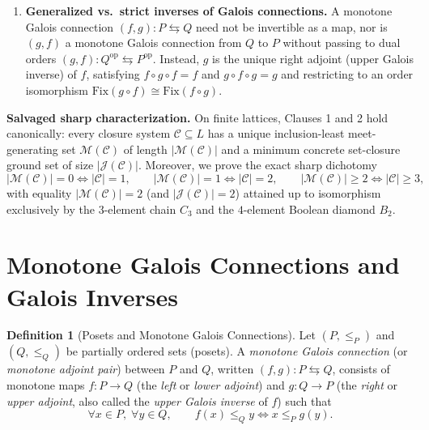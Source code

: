 \documentclass[11pt,a4paper]{article}
\theoremstyle{definition}
\newtheorem{definition}[theorem]{Definition}
\theoremstyle{remark}
\begin{document}
\begin{enumerate}
\item \textbf{Generalized vs.\ strict inverses of Galois connections.} A monotone Galois connection $(f, g) : P \leftrightarrows Q$ need not be invertible as a map, nor is $(g, f)$ a monotone Galois connection from $Q$ to $P$ without passing to dual orders $(g, f) : Q^{\mathrm{op}} \leftrightarrows P^{\mathrm{op}}$. Instead, $g$ is the unique right adjoint (upper Galois inverse) of $f$, satisfying $f \circ g \circ f = f$ and $g \circ f \circ g = g$ and restricting to an order isomorphism $\mathrm{Fix}(g \circ f) \cong \mathrm{Fix}(f \circ g)$.
\end{enumerate}

\noindent\textbf{Salvaged sharp characterization.} On finite lattices, Clauses 1 and 2 hold canonically: every closure system $\mathcal{C} \subseteq L$ has a unique inclusion-least meet-generating set $\mathcal{M}(\mathcal{C})$ of length $|\mathcal{M}(\mathcal{C})|$ and a minimum concrete set-closure ground set of size $|\mathcal{J}(\mathcal{C})|$. Moreover, we prove the exact sharp dichotomy
\[
|\mathcal{M}(\mathcal{C})| = 0 \iff |\mathcal{C}| = 1, \qquad
|\mathcal{M}(\mathcal{C})| = 1 \iff |\mathcal{C}| = 2, \qquad
|\mathcal{M}(\mathcal{C})| \ge 2 \iff |\mathcal{C}| \ge 3,
\]
with equality $|\mathcal{M}(\mathcal{C})| = 2$ (and $|\mathcal{J}(\mathcal{C})| = 2$) attained up to isomorphism exclusively by the $3$-element chain $C_3$ and the $4$-element Boolean diamond $B_2$.

\section{Monotone Galois Connections and Galois Inverses}

\begin{definition}[Posets and Monotone Galois Connections]
Let $(P, \le_P)$ and $(Q, \le_Q)$ be partially ordered sets (posets). A \emph{monotone Galois connection} (or \emph{monotone adjoint pair}) between $P$ and $Q$, written $(f, g) : P \leftrightarrows Q$, consists of monotone maps $f : P \to Q$ (the \emph{left} or \emph{lower adjoint}) and $g : Q \to P$ (the \emph{right} or \emph{upper adjoint}, also called the \emph{upper Galois inverse} of $f$) such that
\begin{equation}\label{eq:adj}
\forall x \in P,\; \forall y \in Q,\qquad f(x) \le_Q y \iff x \le_P g(y).
\end{equation}
\end{definition}
\end{document}
